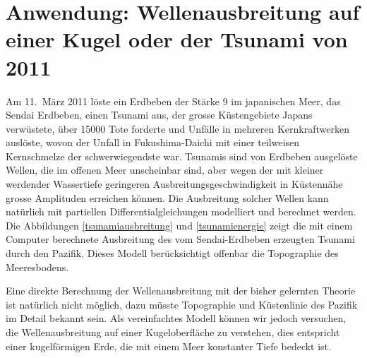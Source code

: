 %
%
%

\section{Anwendung: Wellenausbreitung auf einer Kugel oder der Tsunami von 2011}
Am 11.~März 2011 löste ein Erdbeben der Stärke 9 im japanischen
Meer, das Sendai Erdbeben, einen Tsunami aus, der grosse Küstengebiete
Japans verwüstete, über
15000 Tote forderte und Unfälle in mehreren Kernkraftwerken
auslöste, wovon der Unfall in Fukushima-Daichi mit einer
teilweisen Kernschmelze der schwerwiegendste war.
Tsunamis sind von Erdbeben ausgelöste Wellen, die im offenen
Meer unscheinbar sind, aber wegen der mit kleiner werdender Wassertiefe
geringeren Ausbreitungsgeschwindigkeit in Küstennähe grosse
Amplituden erreichen können. Die Ausbreitung solcher Wellen
kann natürlich mit partiellen Differentialgleichungen modelliert
und berechnet werden. Die Abbildungen \ref{tsunamiausbreitung}
und \ref{tsunamienergie}
zeigt die mit einem Computer berechnete Ausbreitung des vom
Sendai-Erdbeben erzeugten Tsunami durch den Pazifik.
Dieses Modell berücksichtigt offenbar die Topographie des
Meeresbodens.

Eine direkte Berechnung der Wellenausbreitung mit der bisher
gelernten Theorie ist natürlich nicht möglich, dazu müsste
Topographie und Küstenlinie des Pazifik im Detail bekannt
sein. Als vereinfachtes
Modell können wir jedoch versuchen, die Wellenausbreitung auf
einer Kugeloberfläche zu verstehen, dies entspricht einer 
kugelförmigen Erde, die mit einem Meer konstanter Tiefe bedeckt
ist.

